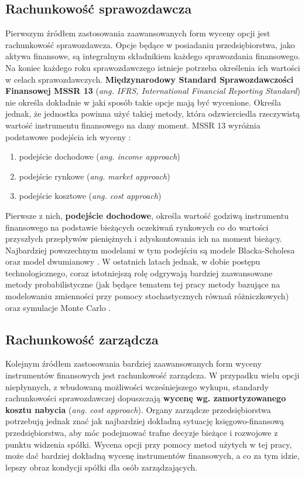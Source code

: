 \documentclass{pracamgr}
\begin{document}
\subsection{Rachunkowość sprawozdawcza} %
\label{sub:rachunkowosc_sprawozdawcza}
Pierwszym źródłem zastosowania zaawansowanych form wyceny opcji jest rachunkowość sprawozdawcza.
Opcje będące w posiadaniu przedsiębiorstwa, jako aktywa finansowe, są integralnym składnikiem każdego sprawozdania finansowego. Na koniec 
każdego roku sprawozdawczego istnieje potrzeba określenia ich wartości w celach sprawozdawczych.
\textbf{Międzynarodowy Standard Sprawozdawczości Finansowej MSSR 13} (\textit{ang. IFRS, International Financial Reporting Standard}) 
nie określa dokładnie w jaki sposób takie opcje mają być wycenione. 
Określa jednak, że jednostka powinna użyć takiej metody, która odzwierciedla
rzeczywistą  wartość instrumentu finansowego na dany moment. MSSR 13 wyróżnia podstawowe podejścia ich wyceny \cite{IFRS2013}:
\begin{enumerate}
  \item podejście dochodowe (\textit{ang. income approach})
  \item podejście rynkowe (\textit{ang. market approach})
  \item podejście kosztowe (\textit{ang. cost approach})
\end{enumerate}
Pierwsze z nich, \textbf{podejście dochodowe}, określa wartość godziwą instrumentu finansowego na podstawie bieżących oczekiwań rynkowych co do wartości 
przyszłych przepływów pieniężnych i zdyskontowania ich na moment bieżący. Najbardziej powszechnym modelami w tym podejściu są modele Blacka-Scholesa 
oraz model dwumianowy \cite{IFRS2013}. W ostatnich latach jednak, w dobie postępu technologicznego, coraz istotniejszą rolę odgrywają bardziej zaawansowane metody probabilistyczne
(jak będące tematem tej pracy metody bazujące na modelowaniu zmienności przy pomocy stochastycznych równań różniczkowych) oraz symulacje Monte Carlo \cite{FairValue2010}.  


\subsection{Rachunkowość zarządcza} %
\label{sub:RachunkowoscZarzadcza}
Kolejnym źródłem zastosowania bardziej zaawansowanych form wyceny instrumentów finansowych jest rachunkowość zarządcza. 
W przypadku wielu opcji niepłynnych, z wbudowaną możliwości wcześniejszego wykupu, standardy rachunkowości sprawozdawczej dopuszczają
\textbf{wycenę wg. zamortyzowanego kosztu nabycia} (\textit{ang. cost approach}). Organy zarządcze 
przedsiębiorstwa potrzebują jednak znać jak najbardziej dokładną sytuację księgowo-finansową przedsiębiorstwa, aby móc podejmować trafne decyzje bieżące i rozwojowe z punktu widzenia spółki. 
Wycena opcji przy pomocy metod użytych w tej pracy, może dać bardziej dokładną wycenę instrumentów 
finansowych, a co za tym idzie, lepszy obraz kondycji spółki dla osób zarządzających.  
\end{document}
